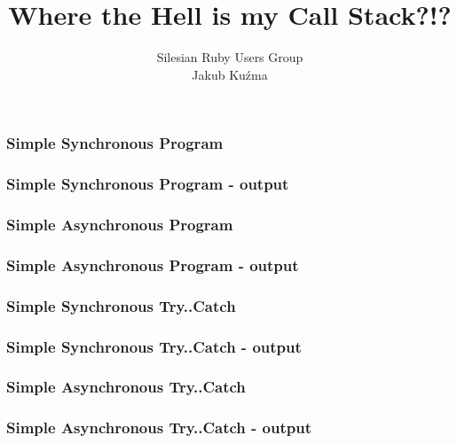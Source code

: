 \documentclass[16pt]{beamer}
\author{Silesian Ruby Users Group\\\footnotesize{Jakub Kuźma}}
\title{Where the Hell is my Call Stack?!?}
\begin{document}
\frame{\titlepage}

\begin{frame}[fragile]
  \frametitle{Simple Synchronous Program}
  \begin{footnotesize}
    
  \end{footnotesize}
\end{frame}

\begin{frame}[fragile]
  \frametitle{Simple Synchronous Program - output}
  \begin{scriptsize}
    
  \end{scriptsize}
\end{frame}

\begin{frame}[fragile]
  \frametitle{Simple Asynchronous Program}
  \begin{footnotesize}
    
  \end{footnotesize}
\end{frame}

\begin{frame}[fragile]
  \frametitle{Simple Asynchronous Program - output}
  \begin{scriptsize}
    
  \end{scriptsize}
\end{frame}

\begin{frame}[fragile]
  \frametitle{Simple Synchronous Try..Catch}
  \begin{footnotesize}
    
  \end{footnotesize}
\end{frame}

\begin{frame}[fragile]
  \frametitle{Simple Synchronous Try..Catch - output}
  \begin{scriptsize}
    
  \end{scriptsize}
\end{frame}

\begin{frame}[fragile]
  \frametitle{Simple Asynchronous Try..Catch}
  \begin{footnotesize}
    
  \end{footnotesize}
\end{frame}

\begin{frame}[fragile]
  \frametitle{Simple Asynchronous Try..Catch - output}
  \begin{scriptsize}
    
  \end{scriptsize}
\end{frame}
\end{document}
